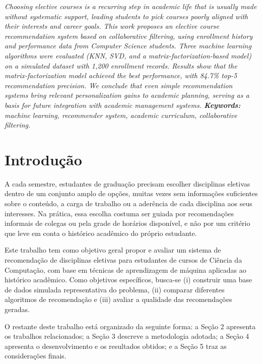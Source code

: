 \documentclass[a4paper,12pt]{article}
\renewenvironment{abstract}{%
  \list{}{\advance\topsep by6pt\relax
    \leftmargin=0.8cm
    \labelwidth=0pt
    \listparindent=0pt
    \itemindent\listparindent
    \rightmargin\leftmargin}\item[\hskip\labelsep\bfseries\itshape Abstract.]\itshape}%
  {\endlist}
\begin{document}
\vspace{6pt}

\begin{abstract}
Choosing elective courses is a recurring step in academic life that is
usually made without systematic support, leading students to pick courses
poorly aligned with their interests and career goals. This work proposes
an elective course recommendation system based on collaborative
filtering, using enrollment history and performance data from Computer
Science students. Three machine learning algorithms were evaluated (KNN,
SVD, and a matrix-factorization-based model) on a simulated dataset with
1,200 enrollment records. Results show that the matrix-factorization
model achieved the best performance, with 84.7\% top-5 recommendation
precision. We conclude that even simple recommendation systems bring
relevant personalization gains to academic planning, serving as a basis
for future integration with academic management systems.
\end{abstract}
\noindent\textbf{Keywords:} machine learning, recommender system, academic curriculum, collaborative filtering.

\vspace{18pt}

\section{Introdução}

A cada semestre, estudantes de graduação precisam escolher disciplinas
eletivas dentro de um conjunto amplo de opções, muitas vezes sem
informações suficientes sobre o conteúdo, a carga de trabalho ou a
aderência de cada disciplina aos seus interesses. Na prática, essa
escolha costuma ser guiada por recomendações informais de colegas ou pela
grade de horários disponível, e não por um critério que leve em conta o
histórico acadêmico do próprio estudante.

Este trabalho tem como objetivo geral propor e avaliar um sistema de
recomendação de disciplinas eletivas para estudantes de cursos de
Ciência da Computação, com base em técnicas de aprendizagem de máquina
aplicadas ao histórico acadêmico. Como objetivos específicos, busca-se
(i) construir uma base de dados simulada representativa do problema,
(ii) comparar diferentes algoritmos de recomendação e (iii) avaliar a
qualidade das recomendações geradas.

O restante deste trabalho está organizado da seguinte forma: a Seção 2
apresenta os trabalhos relacionados; a Seção 3 descreve a metodologia
adotada; a Seção 4 apresenta o desenvolvimento e os resultados obtidos; e
a Seção 5 traz as considerações finais.
\end{document}
